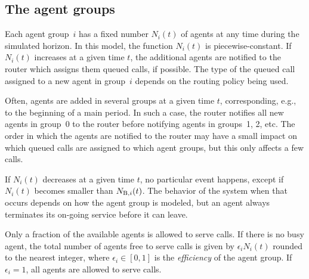 \begin{comment}
\begin{table}
\caption{The periods of a call}
\label{tab:callperiods}

\centering
\begin{tabular}{|l|l|l|} \hline
Horizon & $\pawt$ & $\pstat$ \\ \hline
Finite (see section~\ref{sec:expfinite}) & $\pstat$
& Period of arrival \\
Infinite (see section~\ref{sec:expsteadystate}) & $p$ & 0 \\
\hline
\end{tabular}
\end{table}
\end{comment}

\subsection{The agent groups}

Each agent group~$i$ has a fixed number $N_i(t)$  of agents
at any time during the simulated horizon.
In this model, the function $N_i(t)$ is piecewise-constant.
If $N_i(t)$ increases at a given time $t$, the additional
agents are notified to the router which assigns them queued calls, if
possible.
The type of the queued call assigned to a new agent in group~$i$
depends on the routing policy being used.

Often, agents are added in several groups at a given time $t$,
corresponding, e.g., to the beginning of a main period.
In such a case, the router notifies all new agents in group~0 to the
router before notifying agents in groups~1, 2, etc.
The order in which the agents are notified to the router may have a
small impact on which queued calls are assigned to which agent groups,
but this only affects a few calls.

If $N_i(t)$ decreases at a given time $t$, no particular event
happens, except if $N_i(t)$ becomes smaller than
$\Nb[i](t)$.
The behavior of the system when that occurs
depends on how the agent group is modeled, but an agent
always terminates its on-going service before it can leave.

Only a fraction of the available agents is allowed to
serve calls.  If there is no busy agent, the total number of
agents free to serve calls is given by $\epsilon_i N_i(t)$ rounded to
the nearest integer, where $\epsilon_i\in[0, 1]$ is the
\emph{efficiency} of the agent group.  If $\epsilon_i=1$, all agents
are allowed to serve calls.

